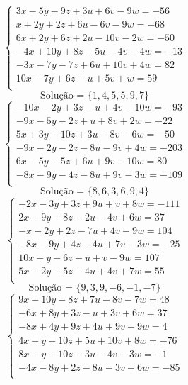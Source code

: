 \documentclass[12pt,oneside,a4paper]{article}
\begin{document}
\vspace{\baselineskip}
\begin{equation*}
\begin{cases}
3x-5y-9z+3u+6v-9w=-56 \\
x+2y+2z+6u-6v-9w=-68 \\
6x+2y+6z+2u-10v-2w=-50 \\
-4x+10y+8z-5u-4v-4w=-13 \\
-3x-7y-7z+6u+10v+4w=82 \\
10x-7y+6z-u+5v+w=59 \\
\end{cases}
\end{equation*}
\begin{equation*}
\text{Solução = }\{1,4,5,5,9,7\}
\end{equation*}
\vspace{\baselineskip}
\begin{equation*}
\begin{cases}
-10x-2y+3z-u+4v-10w=-93 \\
-9x-5y-2z+u+8v+2w=-22 \\
5x+3y-10z+3u-8v-6w=-50 \\
-9x-2y-2z-8u-9v+4w=-203 \\
6x-5y-5z+6u+9v-10w=80 \\
-8x-9y-4z-8u+9v-3w=-109 \\
\end{cases}
\end{equation*}
\begin{equation*}
\text{Solução = }\{8,6,3,6,9,4\}
\end{equation*}
\vspace{\baselineskip}
\begin{equation*}
\begin{cases}
-2x-3y+3z+9u+v+8w=-111 \\
2x-9y+8z-2u-4v+6w=37 \\
-x-2y+2z-7u+4v-9w=104 \\
-8x-9y+4z-4u+7v-3w=-25 \\
10x+y-6z-u+v-9w=107 \\
5x-2y+5z-4u+4v+7w=55 \\
\end{cases}
\end{equation*}
\begin{equation*}
\text{Solução = }\{9,3,9,-6,-1,-7\}
\end{equation*}
\vspace{\baselineskip}
\begin{equation*}
\begin{cases}
9x-10y-8z+7u-8v-7w=48 \\
-6x+8y+3z-u+3v+6w=37 \\
-8x+4y+9z+4u+9v-9w=4 \\
4x+y+10z+5u+10v+8w=-76 \\
8x-y-10z-3u-4v-3w=-1 \\
-4x-8y+2z-8u-3v+6w=-85 \\
\end{cases}
\end{equation*}
\end{document}

